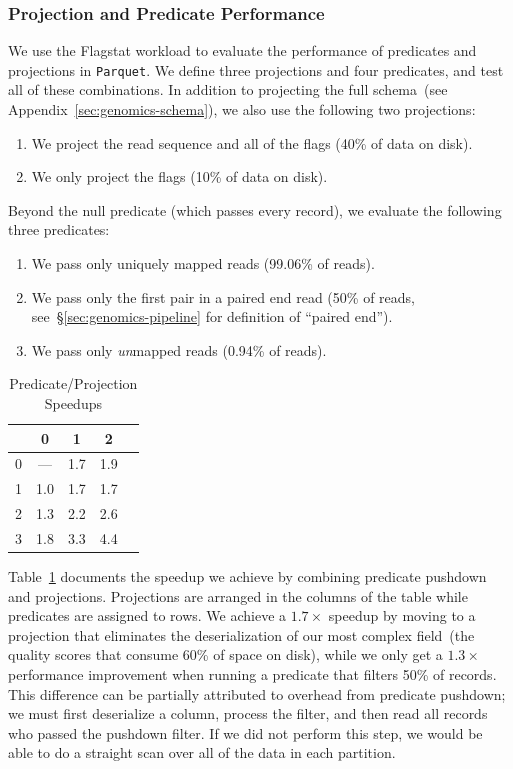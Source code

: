 \documentclass{acm_proc_article-sp}
\begin{document}
\subsubsection{Projection and Predicate Performance}
\label{sec:projection-predicate-performance}

We use the Flagstat workload to evaluate the performance of predicates and projections in \texttt{Parquet}.
We define three projections and four predicates, and test all of these combinations. In addition to projecting the
full schema~(see Appendix~\ref{sec:genomics-schema}), we also use the following two projections:

\begin{enumerate}
\item We project the read sequence and all of the flags (40\% of data on disk).
\item We only project the flags (10\% of data on disk).
\end{enumerate}

Beyond the null predicate (which passes every record), we evaluate the following three predicates:

\begin{enumerate}
\item We pass only uniquely mapped reads (99.06\% of reads).
\item We pass only the first pair in a paired end read (50\% of reads, see~\S\ref{sec:genomics-pipeline} for definition of
``paired end'').
\item We pass only \emph{un}mapped reads (0.94\% of reads).
\end{enumerate}

\begin{table}[h]
\caption{Predicate/Projection Speedups}
\label{tab:ppp}
\begin{center}
\begin{tabular}{ l | c c c c }
\hline
& 0 & 1 & 2 \\
\hline
\hline
0 & --- & 1.7 & 1.9 \\
1 & 1.0 & 1.7 & 1.7 \\
2 & 1.3 & 2.2 & 2.6 \\
3 & 1.8 & 3.3 & 4.4 \\
\hline
\end{tabular}
\end{center}
\end{table}

Table~\ref{tab:ppp} documents the speedup we achieve by combining predicate pushdown and projections. Projections
are arranged in the columns of the table while predicates are assigned to rows. We achieve a $1.7\times$ speedup by
moving to a projection that eliminates the deserialization of our most complex field~(the quality scores that consume
60\% of space on disk), while we only get a $1.3\times$ performance improvement when running a predicate that
filters 50\% of records. This difference can be partially attributed to overhead from predicate pushdown; we must first
deserialize a column, process the filter, and then read all records who passed the pushdown filter. If we did not perform
this step, we would be able to do a straight scan over all of the data in each partition.
\end{document}
